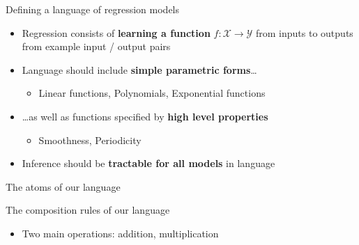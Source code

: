 \begin{frame}{Defining a language of regression models}
  \begin{itemize}
    \item Regression consists of {\bf learning a function} $f: \mathcal{X} \to \mathcal{Y}$ from inputs to outputs from example input / output pairs
    \vspace{\baselineskip}
    \item Language should include {\bf simple parametric forms}\ldots
    \begin{itemize}
       \item \eg Linear functions, Polynomials, Exponential functions
     \end{itemize}
    \vspace{\baselineskip}
    \item \ldots as well as functions specified by {\bf high level properties}
    \begin{itemize}
       \item \eg Smoothness, Periodicity
     \end{itemize}
    \vspace{\baselineskip}
    \item Inference should be {\bf tractable for all models} in language
  \end{itemize}
\end{frame}

\begin{frame}{The atoms of our language}  
  
\end{frame}

\begin{frame}{The composition rules of our language}
\begin{itemize} 
	\item Two main operations: addition, multiplication
\end{itemize}

\end{frame}

